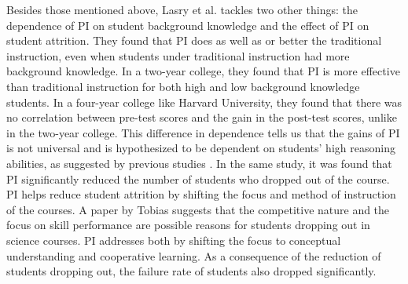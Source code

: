 Besides those mentioned above, Lasry et al. \cite{lasry2008peer} tackles two other things: the dependence of PI on student background knowledge and the effect of PI on student attrition.
They found that PI does as well as or better the traditional instruction, even when students under traditional instruction had more background knowledge.
In a two-year college, they found that PI is more effective than traditional instruction for both high and low background knowledge students.
In a four-year college like Harvard University, they found that there was no correlation between pre-test scores and the gain in the post-test scores, unlike in the two-year college.
This difference in dependence tells us that the gains of PI is not universal and is hypothesized to be dependent on students' high reasoning abilities, as suggested by previous studies \cite{coletta2005interpreting}.
In the same study, it was found that PI significantly reduced the number of students who dropped out of the course.
PI helps reduce student attrition by shifting the focus and method of instruction of the courses.
A paper by Tobias \cite{tobias1990they} suggests that the competitive nature and the focus on skill performance are possible reasons for students dropping out in science courses.
PI addresses both by shifting the focus to conceptual understanding and cooperative learning.
As a consequence of the reduction of students dropping out, the failure rate of students also dropped significantly.




